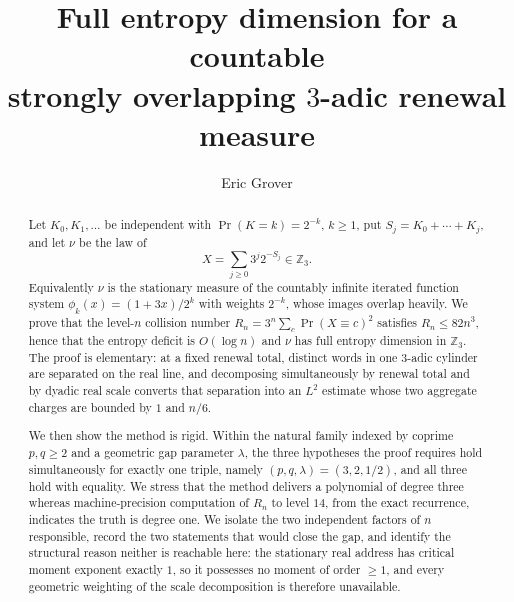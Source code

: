 \documentclass[11pt,reqno]{amsart}
\theoremstyle{plain}
\theoremstyle{definition}
\theoremstyle{remark}
\newcommand{\Zthree}{\mathbb{Z}_3}
\newcommand{\Prob}{\operatorname{Pr}}
\begin{document}
\title[Full entropy dimension for a $3$-adic renewal measure]
      {Full entropy dimension for a countable\\ strongly overlapping
       $3$-adic renewal measure}

\author{Eric Grover}
\address{Independent researcher}


\begin{abstract}
Let $K_0,K_1,\ldots$ be independent with $\Prob(K=k)=2^{-k}$, $k\ge1$, put
$S_j=K_0+\cdots+K_j$, and let $\nu$ be the law of
\[
X=\sum_{j\ge0}3^j2^{-S_j}\in\Zthree .
\]
Equivalently $\nu$ is the stationary measure of the countably infinite
iterated function system $\phi_k(x)=(1+3x)/2^k$ with weights $2^{-k}$,
whose images overlap heavily. We prove that the level-$n$ collision number
$R_n=3^n\sum_c\Prob(X\equiv c)^2$ satisfies $R_n\le82n^3$, hence that the
entropy deficit is $O(\log n)$ and $\nu$ has full entropy dimension in
$\Zthree$. The proof is elementary: at a fixed renewal total, distinct
words in one $3$-adic cylinder are separated on the real line, and
decomposing simultaneously by renewal total and by dyadic real scale
converts that separation into an $L^2$ estimate whose two aggregate charges
are bounded by $1$ and $n/6$.

We then show the method is rigid. Within the natural family indexed by
coprime $p,q\ge2$ and a geometric gap parameter $\lambda$, the three
hypotheses the proof requires hold simultaneously for exactly one triple,
namely $(p,q,\lambda)=(3,2,1/2)$, and all three hold with equality.
We stress that the method delivers a polynomial of degree three whereas
machine-precision computation of $R_n$ to level $14$, from the exact
recurrence, indicates the truth is degree one.
We isolate the two independent factors of $n$ responsible, record the two
statements that would close the gap, and identify the structural reason
neither is reachable here: the stationary real address has critical moment
exponent exactly $1$, so it possesses no moment of order $\ge1$, and every
geometric weighting of the scale decomposition is therefore unavailable.
\end{abstract}

\maketitle
\end{document}
